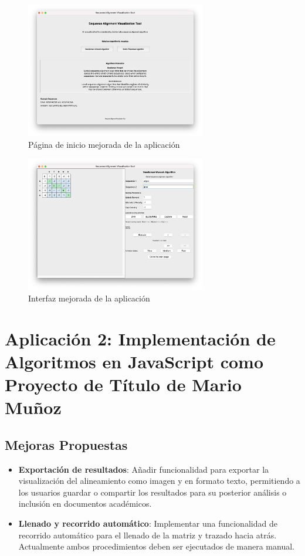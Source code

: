 \documentclass[11pt,a4paper]{article}
\begin{document}
	\begin{figure}[H]
	  \centering
	  \includegraphics[width=0.7\textwidth]{img/Screenshot 2025-05-06 at 21.15.47.png}
	  \caption{Página de inicio mejorada de la aplicación}
	\end{figure}
	
	\begin{figure}[H]
		\centering
		\includegraphics[width=0.7\textwidth]{img/Screenshot 2025-05-06 at 21.16.20.png}
		\caption{Interfaz mejorada de la aplicación}
	\end{figure}
	
  
\section*{Aplicación 2: Implementación de Algoritmos en JavaScript como Proyecto de Título de Mario Muñoz}

\subsection*{Mejoras Propuestas}
\begin{itemize}[noitemsep,topsep=0pt,leftmargin=*]
	\item \textbf{Exportación de resultados}: Añadir funcionalidad para exportar la visualización del alineamiento como imagen y en formato texto, permitiendo a los usuarios guardar o compartir los resultados para su posterior análisis o inclusión en documentos académicos.
	
	\item \textbf{Llenado y recorrido automático}: Implementar una funcionalidad de recorrido automático para el llenado de la matriz y trazado hacia atrás. Actualmente ambos procedimientos deben ser ejecutados de manera manual.
\end{itemize}
\end{document}

